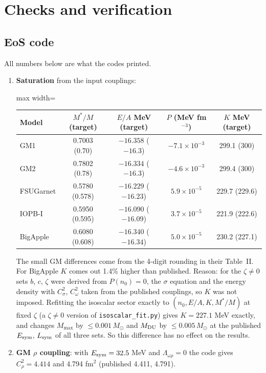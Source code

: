 \documentclass[11pt,a4paper]{article}
\newcommand{\Esym}{E_{\rm sym}}
\newcommand{\Lsym}{L_{\rm sym}}
\newcommand{\Msun}{M_\odot}
\begin{document}
\section{Checks and verification}\label{sec:checks}
\subsection{EoS code}
All numbers below are what the codes printed.
\begin{enumerate}
\item \textbf{Saturation} from the input couplings:
\begin{center}\small
\begin{adjustbox}{max width=\linewidth}
\begin{tabular}{lcccc}
\toprule
Model & $M^*/M$ (target) & $E/A$ MeV (target) & $P$ (MeV fm$^{-3}$) & $K$ MeV (target)\\
\midrule
GM1 & 0.7003 (0.70) & $-16.358$ ($-16.3$) & $-7.1\times10^{-3}$ & 299.1 (300)\\
GM2 & 0.7802 (0.78) & $-16.334$ ($-16.3$) & $-4.6\times10^{-3}$ & 299.4 (300)\\
FSUGarnet & 0.5780 (0.578) & $-16.229$ ($-16.23$) & $5.9\times10^{-5}$ & 229.7 (229.6)\\
IOPB-I & 0.5950 (0.595) & $-16.090$ ($-16.09$) & $3.7\times10^{-5}$ & 221.9 (222.6)\\
BigApple & 0.6080 (0.608) & $-16.340$ ($-16.34$) & $5.0\times10^{-5}$ & 230.2 (227.1)\\
\bottomrule
\end{tabular}
\end{adjustbox}
\end{center}
The small GM differences come from the 4-digit rounding in their Table~II. For BigApple $K$ comes out 1.4\% higher than published. Reason: for the $\zeta\neq0$ sets $b$, $c$, $\zeta$ were derived from $P(n_0)=0$, the $\sigma$ equation and the energy density with $C_\sigma^2$, $C_\omega^2$ taken from the published couplings, so $K$ was not imposed. Refitting the isoscalar sector exactly to $(n_0,E/A,K,M^*/M)$ at fixed $\zeta$ (a $\zeta\neq0$ version of \texttt{isoscalar\_fit.py}) gives $K=227.1$ MeV exactly, and changes $M_{\max}$ by $\le0.001\,\Msun$ and $M_{\rm DU}$ by $\le0.005\,\Msun$ at the published $\Esym$, $\Lsym$ of all three sets. So this difference has no effect on the results.
\item \textbf{GM $\rho$ coupling}: with $\Esym=32.5$ MeV and $\Lambda_{\omega\rho}=0$ the code gives $C_\rho^2=4.414$ and 4.794 fm$^2$ (published 4.411, 4.791).

\end{enumerate}
\end{document}
